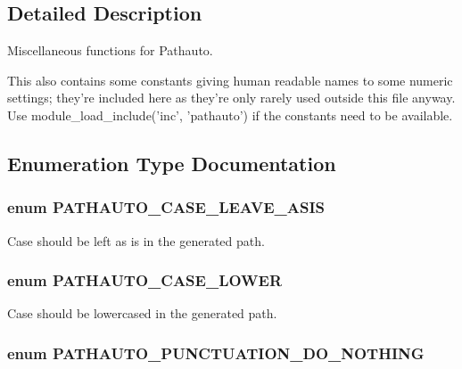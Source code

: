 \subsection{Detailed Description}
Miscellaneous functions for Pathauto.

This also contains some constants giving human readable names to some numeric settings; they're included here as they're only rarely used outside this file anyway. Use module\_\-load\_\-include('inc', 'pathauto') if the constants need to be available. 

\subsection{Enumeration Type Documentation}
\hypertarget{pathauto_8inc_a70a76b2fb16c0b865f671bda8b720edb}{
\subsubsection[{PATHAUTO\_\-CASE\_\-LEAVE\_\-ASIS}]{\setlength{\rightskip}{0pt plus 5cm}enum {\bf PATHAUTO\_\-CASE\_\-LEAVE\_\-ASIS}}}
\label{pathauto_8inc_a70a76b2fb16c0b865f671bda8b720edb}
Case should be left as is in the generated path. \hypertarget{pathauto_8inc_a35b6bbe534b05c42eeb8945b6ffe2a50}{
\subsubsection[{PATHAUTO\_\-CASE\_\-LOWER}]{\setlength{\rightskip}{0pt plus 5cm}enum {\bf PATHAUTO\_\-CASE\_\-LOWER}}}
\label{pathauto_8inc_a35b6bbe534b05c42eeb8945b6ffe2a50}
Case should be lowercased in the generated path. \hypertarget{pathauto_8inc_a2b584fde6bb4b7c7fb17c3e2f9ca3b65}{
\subsubsection[{PATHAUTO\_\-PUNCTUATION\_\-DO\_\-NOTHING}]{\setlength{\rightskip}{0pt plus 5cm}enum {\bf PATHAUTO\_\-PUNCTUATION\_\-DO\_\-NOTHING}}}
